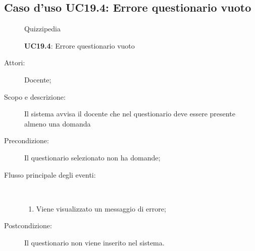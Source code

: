 \subsection{Caso d'uso UC19.4: Errore questionario vuoto}
	\begin{figure}[H]
		\centering
		\begin{resizedtikzpicture}{\textwidth}
		\begin{umlsystem}[x=0, fill=lightgray!20]{Quizzipedia}
		\end{umlsystem}
		\end{resizedtikzpicture}
		\caption{\textbf{UC19.4}: Errore questionario vuoto}
		\label{UC19.4}
	\end{figure}
\begin{description}
\item[Attori:] Docente;
\item[Scopo e descrizione:] Il sistema avvisa il docente che nel questionario deve essere presente almeno una domanda
      \item[Precondizione:] Il questionario selezionato non ha domande;

        \item[Flusso principale degli eventi:] \ 
 \begin{enumerate}
          \item Viene visualizzato un messaggio di errore;

      \end{enumerate}
    \item[Postcondizione:] Il questionario non viene inserito nel sistema.
  \end{description}
\hypertarget{UC19.5}{}
